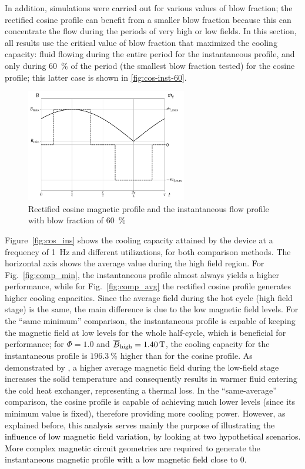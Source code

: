 \documentclass[referee]{svjour3}
\begin{document}
In addition, simulations were \textcolor{black}{carried out} for various values of blow fraction; the rectified cosine profile can benefit from a smaller blow fraction because this can concentrate the flow during the periods of very high or low fields. In this section, all results use the critical value of blow fraction that maximized the cooling capacity: fluid flowing during the entire period for the instantaneous profile, and only during \SI{60}{\percent}  of the period (the smallest blow fraction tested) for the cosine profile; this latter case is shown in \autoref{fig:cos-inst-60}.

\begin{figure}[!ht]
  \centering
  \includegraphics[width=7cm]{profiles_rc_and_flow_instantaneous}
  \caption{Rectified cosine magnetic profile and the instantaneous flow profile with blow fraction of \SI{60}{\percent}}
  \label{fig:cos-inst-60}
\end{figure}

Figure~\ref{fig:cos_ins} shows the cooling capacity attained by the device at a frequency of \SI{1}{\hertz} and different utilizations, for both comparison methods. The horizontal axis shows the average value during the high field region. 
\textcolor{black}{For} Fig.~\ref{fig:comp_min}, the instantaneous profile almost always yields a higher performance, while for Fig.~\ref{fig:comp_avg} the rectified cosine profile generates higher cooling capacities. Since the average \textcolor{black}{field} during the hot cycle (high field stage) is the same, the main difference is due to the low magnetic field levels. For the ``same minimum'' comparison, the instantaneous profile is capable of keeping the magnetic field at low levels for the whole half-cycle, which is beneficial for performance;  for $\Phi=1.0$ and $\overline{B}_{\mathrm{high}} = \SI{1.40}{\tesla}$, the cooling capacity for the instantaneous profile is $\SI{196.3}{\percent}$ higher than for the cosine profile.  As demonstrated by \cite{bib:asme-mce}, a higher average magnetic field during the low-field stage increases the solid temperature and consequently results in  warmer fluid entering the cold heat exchanger, representing a thermal loss. In the ``same-average'' comparison, the cosine profile is capable of achieving much lower levels (since its minimum value is fixed), therefore providing more cooling power. However, as explained before, this \textcolor{black}{analysis serves mainly the purpose of illustrating the influence of low magnetic field variation, by looking at two hypothetical scenarios. More} complex \textcolor{black}{magnetic circuit}  geometries \textcolor{black}{are} required to generate the instantaneous magnetic profile \textcolor{black}{with a} low \textcolor{black}{magnetic field} close to 0.
\end{document}
